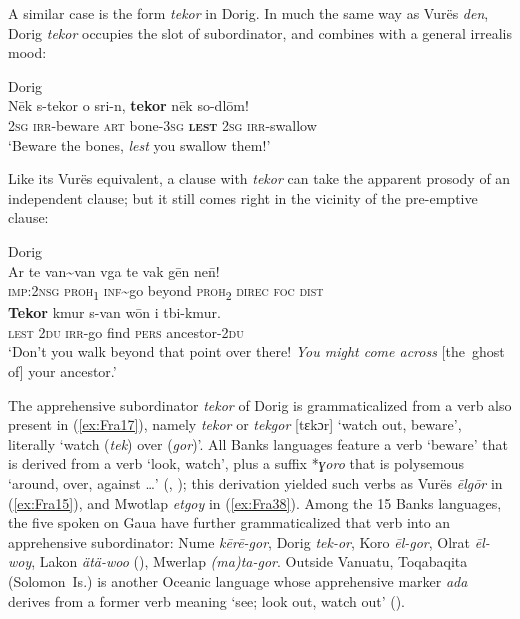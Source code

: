 \documentclass[output=paper,colorlinks,citecolor=brown]{langscibook}
\begin{document}
A similar case is the form \textit{tekor} in Dorig. In much the same way as Vurës \textit{den}, Dorig \textit{tekor} occupies the slot of subordinator, and combines with a general irrealis mood:

\ea \label{ex:Fra17} \textnormal{Dorig}  \\
\gll Nēk s-tekor o sri-n, \textbf{tekor} nēk so-dlōm! \\
\textsc{2sg} \textsc{irr}-beware \textsc{art} bone-\textsc{3sg} \textsc{\textbf{lest}} \textsc{2sg} \textsc{irr}-swallow \\
\glt `Beware the bones, \textit{lest} you swallow them!' 
\z

\noindent Like its Vurës equivalent, a clause with \textit{tekor} can take the apparent prosody of an independent clause; but it still comes right in the vicinity of the pre-emptive clause:
 
\ea \label{ex:Fra18} \textnormal{Dorig}   \\
\gll Ar te van\textasciitilde van vga te vak gēn ne\={n}! \\ 
\textsc{imp:2nsg} \textsc{proh\textsubscript{1}} \textsc{inf}\textasciitilde go beyond \textsc{proh\textsubscript{2}} \textsc{direc} \textsc{foc} \textsc{dist} \\
\linebreak \gll \textbf{Tekor} kmur s-van wōn i tbi-kmur. \\
\textsc{lest} \textsc{2du} \textsc{irr}-go find \textsc{pers} ancestor-\textsc{2du} \\
\glt `Don't you walk beyond that point over there! \textit{You might come across} [the~ghost of] your ancestor.' 
\z

The apprehensive subordinator \textit{tekor} of Dorig is grammaticalized from a verb also present in (\ref{ex:Fra17}), namely \textit{tekor} or \textit{tekgor} [tɛkɔr] `watch out, beware', literally `watch (\textit{tek}) over (\textit{gor})'. All Banks languages feature a verb `beware' that is derived from a verb `look, watch', plus a suffix *\textit{ɣoro} that is polysemous `around, over, against {\ldots}' (\citealt{François2000}, \citeyear[495]{François2005b}); this derivation yielded such verbs as Vurës \textit{ēlgōr} in (\ref{ex:Fra15}), and Mwotlap \textit{etgoy} in (\ref{ex:Fra38}). Among the 15 Banks languages, the five spoken on Gaua have further grammaticalized that verb into an apprehensive subordinator: Nume \textit{kērē-gor}, Dorig \textit{tek-or}, Koro \textit{ēl-gor}, Olrat \mbox{\textit{ēl-woy}}, Lakon \textit{ätä-woo} (), Mwerlap \textit{(ma)ta-gor}. Outside Vanuatu, Toqabaqita (Solomon~Is.) is another Oceanic language whose apprehensive marker \textit{ada} derives from a former verb meaning `see; look out, watch out' (\citealt[780]{Lichtenberk2008}).
\end{document}

